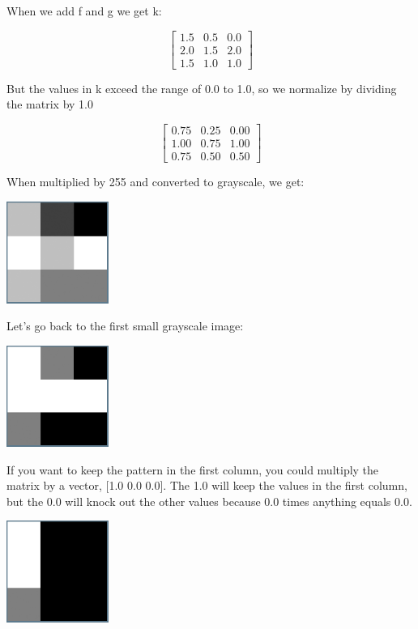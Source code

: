 When we add f and g we get k:

$$\begin{bmatrix}
1.5 & 0.5 & 0.0\\
2.0 & 1.5 & 2.0\\
1.5 & 1.0 & 1.0 
\end{bmatrix}$$

But the values in k exceed the range of 0.0 to 1.0, so we normalize by dividing the matrix by 1.0

$$\begin{bmatrix}
0.75 & 0.25 & 0.00\\
1.00 & 0.75 & 1.00\\
0.75 & 0.50 & 0.50  
\end{bmatrix}$$

When multiplied by 255 and converted to grayscale, we get:

\includegraphics[width=0.25\textwidth]{fgBitmapAdded.png}

Let's go back to the first small grayscale image:

\includegraphics[width=0.25\textwidth]{fBitmap.png}

If you want to keep the pattern in the first column, you could multiply the matrix by a vector, [1.0 0.0 0.0]. The 1.0 will keep the values in the first column, but the 0.0 will knock out the other values because 0.0 times anything equals 0.0.

\includegraphics[width=0.25\textwidth]{onechannel.png}

